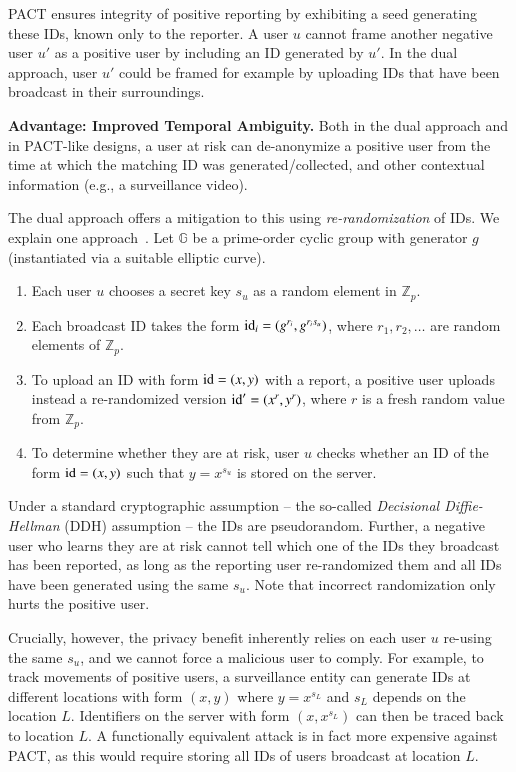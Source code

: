 \documentclass{article}
\begin{document}
PACT ensures integrity of positive reporting by exhibiting a seed generating these IDs, known only to the reporter. A user $u$ cannot frame another negative user $u'$ as a positive user by including an ID generated by $u'$. In the dual approach, user $u'$ could be framed for example by uploading IDs that have been broadcast in their surroundings.  


{\bf Advantage: Improved Temporal Ambiguity.} Both in the dual approach and in PACT-like designs, a user at risk can de-anonymize a positive user from the time at which the matching ID was generated/collected, and other contextual information (e.g., a surveillance video). 

The dual approach offers a mitigation to this using {\em re-randomization} of IDs. We explain one approach~\cite{yael}. Let $\mathbb{G}$ be a prime-order cyclic group with generator $g$ (instantiated via a suitable elliptic curve). 
\begin{enumerate}
    \item Each user $u$ chooses a secret key $s_u$ as a random element in $\mathbb{Z}_p$.
    \item Each broadcast ID takes the form $\mathrm{id}_i = (g^{r_i}, g^{r_i s_u})$, where $r_1, r_2, \ldots$ are random elements of $\mathbb{Z}_p$.
    \item To upload an ID with form $\mathrm{id} = (x, y)$ with a report, a positive user uploads instead a re-randomized version $\mathrm{id}' = (x^r, y^r)$, where $r$ is a fresh random value from $\mathbb{Z}_p$.
    \item To determine whether they are at risk, user $u$ checks whether an ID of the form $\mathrm{id} = (x,y)$ such that $y = x^{s_u}$ is stored on the server.
\end{enumerate}
Under a standard cryptographic assumption -- the so-called {\em Decisional Diffie-Hellman} (DDH) assumption -- the IDs are pseudorandom. Further, a negative user who learns they are at risk cannot tell which one of the IDs they broadcast has been reported, as long as the reporting user re-randomized them and all IDs have been generated using the same $s_u$. Note that incorrect randomization only hurts the positive user.

Crucially, however, the privacy benefit inherently relies on each user $u$ re-using the same $s_u$, and we cannot force a malicious user to comply. For example, to track movements of positive users, a surveillance entity can generate IDs at different locations with form $(x,y)$ where $y = x^{s_L}$ and $s_L$ depends on the location $L$. Identifiers on the server with form $(x, x^{s_L})$ can then be traced back to location $L$. A functionally equivalent attack is in fact more expensive against PACT, as this would require storing all IDs of users broadcast at location $L$.  
\end{document}
